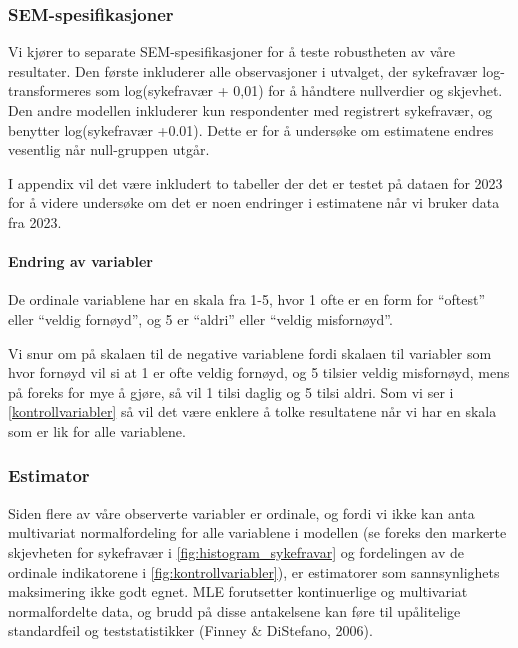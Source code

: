 \documentclass[
  12pt,
  a4paper,
  DIV=11,
  numbers=noendperiod]{scrartcl}
\let\oldparagraph\paragraph
\renewcommand{\paragraph}[1]{\oldparagraph{#1}\mbox{}}
\begin{document}
\subsubsection{SEM-spesifikasjoner}\label{sem-spesifikasjoner}

Vi kjører to separate SEM-spesifikasjoner for å teste robustheten av
våre resultater. Den første inkluderer alle observasjoner i utvalget,
der sykefravær log-transformeres som log(sykefravær + 0,01) for å
håndtere nullverdier og skjevhet. Den andre modellen inkluderer kun
respondenter med registrert sykefravær, og benytter log(sykefravær
+0.01). Dette er for å undersøke om estimatene endres vesentlig når
null-gruppen utgår.

I appendix vil det være inkludert to tabeller der det er testet på
dataen for 2023 for å videre undersøke om det er noen endringer i
estimatene når vi bruker data fra 2023.

\paragraph{Endring av variabler}\label{endring-av-variabler}

De ordinale variablene har en skala fra 1-5, hvor 1 ofte er en form for
``oftest'' eller ``veldig fornøyd'', og 5 er ``aldri'' eller ``veldig
misfornøyd''.

Vi snur om på skalaen til de negative variablene fordi skalaen til
variabler som hvor fornøyd vil si at 1 er ofte veldig fornøyd, og 5
tilsier veldig misfornøyd, mens på foreks for mye å gjøre, så vil 1
tilsi daglig og 5 tilsi aldri. Som vi ser i \autoref{kontrollvariabler}
så vil det være enklere å tolke resultatene når vi har en skala som er
lik for alle variablene.

\subsubsection{Estimator}\label{estimator}

Siden flere av våre observerte variabler er ordinale, og fordi vi ikke
kan anta multivariat normalfordeling for alle variablene i modellen (se
foreks den markerte skjevheten for sykefravær i
\autoref{fig:histogram_sykefravar} og fordelingen av de ordinale
indikatorene i \autoref{fig:kontrollvariabler}), er estimatorer som
sannsynlighets maksimering ikke godt egnet. MLE forutsetter
kontinuerlige og multivariat normalfordelte data, og brudd på disse
antakelsene kan føre til upålitelige standardfeil og teststatistikker
(Finney \& DiStefano, 2006).
\end{document}
